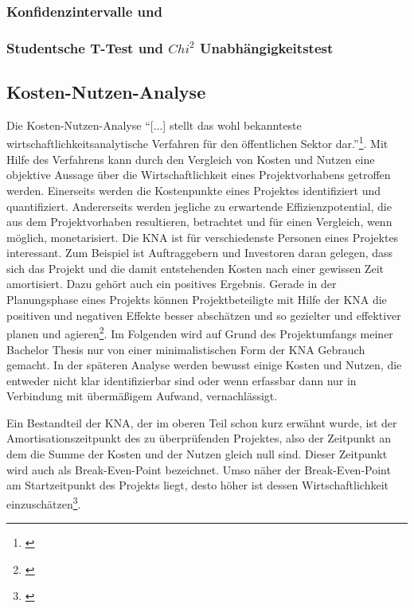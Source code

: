 
\subsubsection{Konfidenzintervalle und }


\subsubsection{Studentsche T-Test und $Chi^2$ Unabhängigkeitstest}



\subsection{Kosten-Nutzen-Analyse}
Die Kosten-Nutzen-Analyse \enquote{[...] stellt das wohl bekannteste wirtschaftlichkeitsanalytische Verfahren für den öffentlichen Sektor dar.}\footnote{\cite[vgl.][1]{Hanusch2011}}. Mit Hilfe des Verfahrens kann durch den Vergleich von Kosten und Nutzen eine objektive Aussage über die Wirtschaftlichkeit eines Projektvorhabens getroffen werden. Einerseits werden die Kostenpunkte eines Projektes identifiziert und quantifiziert. Andererseits werden jegliche zu erwartende Effizienzpotential, die aus dem Projektvorhaben resultieren, betrachtet und für einen Vergleich, wenn möglich, monetarisiert. Die \gls{KNA} ist für verschiedenste Personen eines Projektes interessant. Zum Beispiel ist Auftraggebern und Investoren daran gelegen, dass sich das Projekt und die damit entstehenden Kosten nach einer gewissen Zeit amortisiert. Dazu gehört auch ein positives Ergebnis. Gerade in der Planungsphase eines Projekts können Projektbeteiligte mit Hilfe der \gls{KNA} die positiven und negativen Effekte besser abschätzen und so gezielter und effektiver planen und agieren\footnote{\cite[vgl.][]{Hanusch2011}}. Im Folgenden wird auf Grund des Projektumfangs meiner Bachelor Thesis nur von einer minimalistischen Form der \gls{KNA} Gebrauch gemacht. In der späteren Analyse werden bewusst einige Kosten und Nutzen, die entweder nicht klar identifizierbar sind oder wenn erfassbar dann nur in Verbindung mit übermäßigem Aufwand, vernachlässigt. 

Ein Bestandteil der \gls{KNA}, der im oberen Teil schon kurz erwähnt wurde, ist der Amortisationszeitpunkt des zu überprüfenden Projektes, also der Zeitpunkt an dem die Summe der Kosten und der Nutzen gleich null sind. Dieser Zeitpunkt wird auch als Break-Even-Point bezeichnet. Umso näher der Break-Even-Point am Startzeitpunkt des Projekts liegt, desto höher ist dessen Wirtschaftlichkeit einzuschätzen\footnote{\cite[vgl.][]{Hanusch2011}}.

